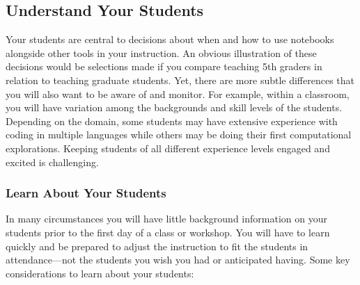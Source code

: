 \documentclass[]{book}
\begin{document}
\subsection{Understand Your Students}\label{understand-your-students}

Your students are central to decisions about when and how to use
notebooks alongside other tools in your instruction. An obvious
illustration of these decisions would be selections made if you compare
teaching 5th graders in relation to teaching graduate students. Yet,
there are more subtle differences that you will also want to be aware of
and monitor. For example, within a classroom, you will have variation
among the backgrounds and skill levels of the students. Depending on the
domain, some students may have extensive experience with coding in
multiple languages while others may be doing their first computational
explorations. Keeping students of all different experience levels
engaged and excited is challenging.

\subsubsection{Learn About Your
Students}\label{learn-about-your-students}

In many circumstances you will have little background information on
your students prior to the first day of a class or workshop. You will
have to learn quickly and be prepared to adjust the instruction to fit
the students in attendance---not the students you wish you had or
anticipated having. Some key considerations to learn about your
students:
\end{document}
